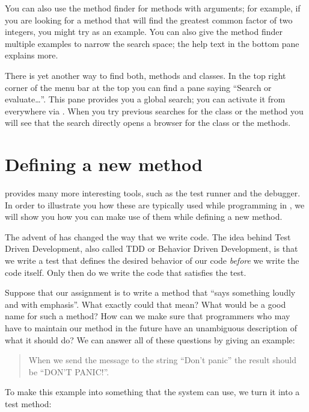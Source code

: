\documentclass[a4paper,10pt,twoside]{book}
\begin{document}
You can also use the method finder for methods with arguments; for example, if you are looking for a method that will find the greatest common factor of two integers, you might try  as an example.  You can also give the method finder multiple examples to narrow the search space; the help text in the bottom pane explains more.

There is yet another way to find both, methods and classes. In the top right corner of the menu bar at the top you can find a pane saying ``Search or evaluate\ldots''. This pane provides you a global search; you can activate it from everywhere via . When you try previous searches for the class  or the method  you will see that the search directly opens a browser for the class or the methods.

\section{Defining a new method}

\sq provides many more interesting tools, such as the test runner and the debugger. In order to illustrate you how these are typically used while programming in \sq, we will show you how you can make use of them while defining a new method.

The advent of \cite{Beck03a} has changed the way that we write code.  
The idea behind Test Driven Development, also called TDD or Behavior Driven Development, is that we write a test that defines the desired behavior of our code \emph{before} we write the code itself.
Only then do we write the code that satisfies the test.

Suppose that our assignment is to write a method that ``says something loudly and with emphasis''.  What exactly could that mean?  What would be a good name for such a method?  How can we make sure  that programmers who may have to maintain our method in the future have an unambiguous description of what it should do?   We can answer all of these questions by giving an example:

\begin{quote}
When we send the message  to the string ``Don't panic'' the result should be ``DON'T PANIC!''.
\end{quote}

\noindent
To make this example into something that the system can use, we turn it into a test method:
\end{document}
